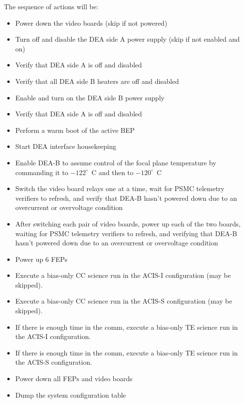 \documentclass[11pt]{article}
\begin{document}
\noindent The sequence of actions will be:
\begin{itemize}
\item Power down the video boards (skip if not powered)
\vspace{-0.10in}
\item Turn off and disable the DEA side A power supply (skip if not enabled and on)
\vspace{-0.10in}
\item Verify that DEA side A is off and disabled
\vspace{-0.10in}
\item Verify that all DEA side B heaters are off and disabled
\vspace{-0.10in}
\item Enable and turn on the DEA side B power supply
\vspace{-0.10in}
\item Verify that DEA side A is off and disabled
\vspace{-0.10in}
\item Perform a warm boot of the active BEP
\vspace{-0.10in}
\item Start DEA interface housekeeping
\vspace{-0.10in}
\item Enable DEA-B to assume control of the focal plane temperature
by commanding it to $-122^\circ$~C and then to $-120^\circ$~C
\vspace{-0.10in}
\item Switch the video board relays one at a time,
wait for PSMC telemetry verifiers to refresh,
and verify that DEA-B hasn't powered down due to an overcurrent
or overvoltage condition
\vspace{-0.10in}
\item After switching each pair of video boards,
power up each of the two boards, waiting for PSMC telemetry verifiers to 
refresh, and verifying that DEA-B hasn't powered down due to an overcurrent
or overvoltage condition
\vspace{-0.10in}
\item Power up 6 FEPs
\vspace{-0.10in}
\item Execute a bias-only CC science run in the ACIS-I configuration (may be skipped).
\vspace{-0.10in}
\item Execute a bias-only CC science run in the ACIS-S configuration (may be skipped).
\vspace{-0.10in}
\item If there is enough time in the comm, execute a bias-only TE science run in the ACIS-I configuration.
\vspace{-0.10in}
\item If there is enough time in the comm, execute a bias-only TE science run in the ACIS-S configuration.
\vspace{-0.10in}
\item Power down all FEPs and video boards
\vspace{-0.10in}
\item Dump the system configuration table
\end{itemize}
\end{document}
